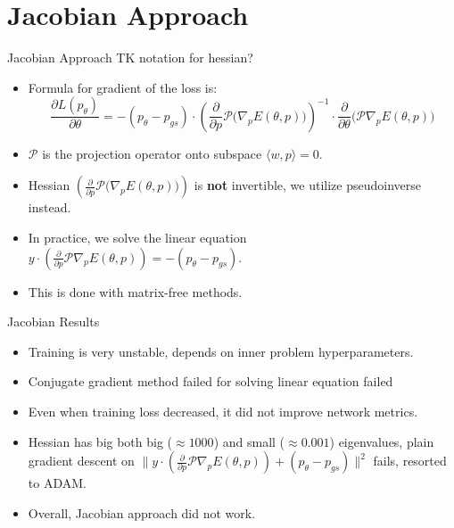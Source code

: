 \documentclass{beamer}
\begin{document}
\section{Jacobian Approach}
\begin{frame}{Jacobian Approach}
TK notation for hessian?

  \begin{itemize}
    \item Formula for gradient of the loss is:
    \[
      \frac{\partial L(p_{\theta})}{\partial \theta} = -(p_{\theta}-p_{gs}) \cdot \left(\frac{\partial}{\partial p}\mathcal{P}\big(\nabla_p E(\theta, p)\big)\right)^{-1} \cdot \frac{\partial}{\partial \theta}\big(\mathcal{P}\nabla_p E(\theta, p)\big)
    \]
    \item  $\mathcal{P}$ is the projection operator onto subspace $\langle w,p \rangle = 0$.
    \item Hessian $ \left(\frac{\partial}{\partial p}\mathcal{P}\big(\nabla_p E(\theta, p)\big)\right)$ is \textbf{not} invertible, we utilize pseudoinverse instead.
    \item In practice, we solve the linear equation $ y \cdot \left(\frac{\partial}{\partial p}\mathcal{P}\nabla_p E(\theta, p)\right) = -(p_{\theta}-p_{gs})$.
    \item This is done with matrix-free methods.
  \end{itemize}
\end{frame}

\begin{frame}{Jacobian Results}
  \begin{itemize}
    \item Training is very unstable, depends on inner problem hyperparameters.
    \item Conjugate gradient method failed for solving linear equation failed
    \item Even when training loss decreased, it did not improve network metrics.
    \item Hessian has big both big ($\approx 1000$) and small ($\approx 0.001$) eigenvalues, plain gradient descent on $\|y \cdot \left(\frac{\partial}{\partial p}\mathcal{P}\nabla_p E(\theta, p)\right) + (p_{\theta}-p_{gs})\|^2$ fails, resorted to ADAM.
    \item Overall, Jacobian approach did not work.
  \end{itemize}
\end{frame}



\end{document}
